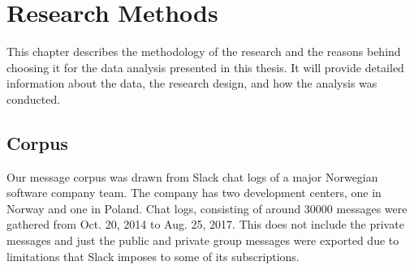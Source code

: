 \chapter{Research Methods}
This chapter describes the methodology of the research and the reasons behind choosing it for the data analysis presented in this thesis. It will provide detailed information about the data, the research design, and how the analysis was conducted.


\section{Corpus}
Our message corpus was drawn from Slack chat logs of a major Norwegian software company team. The company has two development centers, one in Norway and one in Poland. Chat logs, consisting of around 30000 messages were gathered from Oct. 20, 2014 to Aug. 25, 2017. This does not include the private messages and just the public and private group messages were exported due to limitations that Slack imposes to some of its subscriptions.